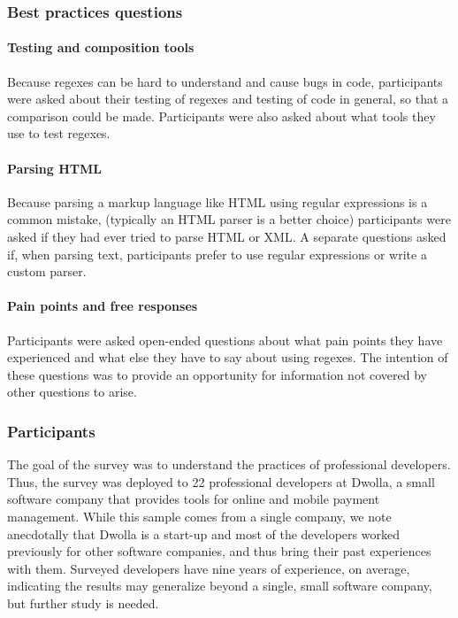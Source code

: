 \subsubsection{Best practices questions}
\paragraph{Testing and composition tools} Because regexes can be hard to understand and cause bugs in code, participants were asked about their testing of regexes and testing of code in general, so that a comparison could be made.  Participants were also asked about what tools they use to test regexes.

\paragraph{Parsing HTML} Because parsing a markup language like HTML using regular expressions is a common mistake, (typically an HTML parser is a better choice) participants were asked if they had ever tried to parse HTML or XML.  A separate questions asked if, when parsing text, participants prefer to use regular expressions or write a custom parser.

\paragraph{Pain points and free responses} Participants were asked open-ended questions about what pain points they have experienced and what else they have to say about using regexes.  The intention of these questions was to provide an opportunity for information not covered by other questions to arise.

\subsubsection{Participants}
The goal of the survey was to understand the practices of professional developers. Thus, the survey was deployed to 22 professional developers at Dwolla, a small software company that provides tools for online and mobile payment management. While this sample comes from a single company, we note anecdotally that Dwolla is a start-up and most of the developers worked previously for other software companies, and thus bring their past experiences with them. Surveyed developers have nine years of experience, on average, indicating the results may generalize beyond a single, small software company, but further study is needed.
